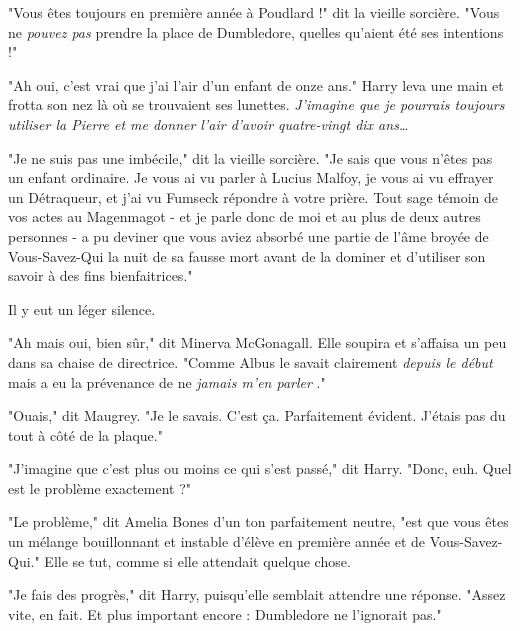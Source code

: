 "Vous êtes toujours en première année à Poudlard !" dit la vieille sorcière. "Vous ne \emph{pouvez pas}  prendre la place de Dumbledore, quelles qu'aient été ses intentions !"

"Ah oui, c'est vrai que j'ai l'air d'un enfant de onze ans." Harry leva une main et frotta son nez là où se trouvaient ses lunettes. \emph{J'imagine que je pourrais toujours utiliser la Pierre et me donner l'air d'avoir quatre-vingt dix ans…} 

"Je ne suis pas une imbécile," dit la vieille sorcière. "Je sais que vous n'êtes pas un enfant ordinaire. Je vous ai vu parler à Lucius Malfoy, je vous ai vu effrayer un Détraqueur, et j'ai vu Fumseck répondre à votre prière. Tout sage témoin de vos actes au Magenmagot - et je parle donc de moi et au plus de deux autres personnes - a pu deviner que vous aviez absorbé une partie de l'âme broyée de Vous-Savez-Qui la nuit de sa fausse mort avant de la dominer et d'utiliser son savoir à des fins bienfaitrices."

Il y eut un léger silence.

"Ah mais oui, bien sûr," dit Minerva McGonagall. Elle soupira et s'affaisa un peu dans sa chaise de directrice. "Comme Albus le savait clairement \emph{depuis le début}  mais a eu la prévenance de ne \emph{jamais m'en parler} ."

"Ouais," dit Maugrey. "Je le savais. C'est ça. Parfaitement évident. J'étais pas du tout à côté de la plaque."

"J'imagine que c'est plus ou moins ce qui s'est passé," dit Harry. "Donc, euh. Quel est le problème exactement ?"

"Le problème," dit Amelia Bones d'un ton parfaitement neutre, "est que vous êtes un mélange bouillonnant et instable d'élève en première année et de Vous-Savez-Qui." Elle se tut, comme si elle attendait quelque chose.

"Je fais des progrès," dit Harry, puisqu'elle semblait attendre une réponse. "Assez vite, en fait. Et plus important encore : Dumbledore ne l'ignorait pas."

